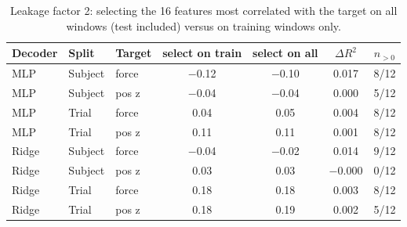 \begin{table}[t]
\centering
\caption{Leakage factor 2: selecting the 16 features most correlated with the target on all windows (test included) versus on training windows only.}
\label{tab:selection}
\footnotesize
\setlength{\tabcolsep}{3pt}
\begin{tabular}{lllcccc}
\toprule
Decoder & Split & Target & select on train & select on all & $\Delta R^2$ & $n_{>0}$ \\
\midrule
MLP & Subject & force & $-$0.12 & $-$0.10 & 0.017 & 8/12 \\
MLP & Subject & pos z & $-$0.04 & $-$0.04 & 0.000 & 5/12 \\
MLP & Trial & force & 0.04 & 0.05 & 0.004 & 8/12 \\
MLP & Trial & pos z & 0.11 & 0.11 & 0.001 & 8/12 \\
Ridge & Subject & force & $-$0.04 & $-$0.02 & 0.014 & 9/12 \\
Ridge & Subject & pos z & 0.03 & 0.03 & $-$0.000 & 0/12 \\
Ridge & Trial & force & 0.18 & 0.18 & 0.003 & 8/12 \\
Ridge & Trial & pos z & 0.18 & 0.19 & 0.002 & 5/12 \\
\bottomrule
\end{tabular}
\end{table}
